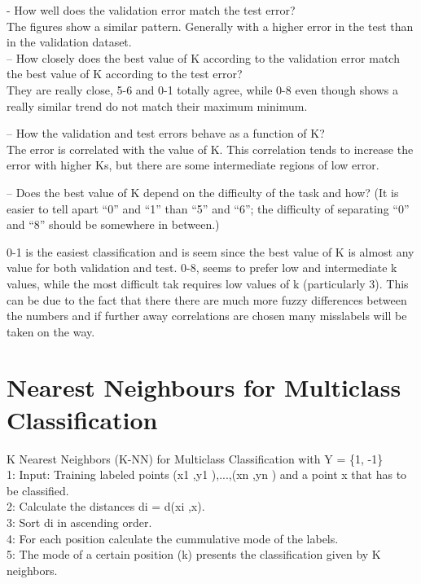 \documentclass[a4paper]{article}
\begin{document}
- How well does the validation error match the test error?\\

The figures show a similar pattern. Generally with a higher error in the test than in the validation dataset.\\

– How closely does the best value of K according to the validation error
match the best value of K according to the test error?\\
They are really close, 5-6 and 0-1 totally agree, while 0-8 even though shows a really similar trend do not match their maximum minimum.

– How the validation and test errors behave as a function of K? \\
The error is correlated with the value of K. This correlation tends to increase the error with higher Ks, but there are some intermediate regions of low error.


– Does the best value of K depend on the difficulty of the task and how?
(It is easier to tell apart “0” and “1” than “5” and “6”; the difficulty
of separating “0” and “8” should be somewhere in between.)

0-1 is the easiest classification and is seem since the best value of K is almost any value for both validation and test. 0-8, seems to prefer low and intermediate k values, while the most difficult tak requires low values of k (particularly 3). This can be due to the fact that there there are much more fuzzy differences between the numbers and if further away correlations are chosen many misslabels will be taken on the way.


\section{Nearest Neighbours for Multiclass Classification}
 K Nearest Neighbors (K-NN) for Multiclass Classification with Y = \{1, -1\} \\
1: Input: Training labeled points {(x1 ,y1 ),...,(xn ,yn )} and a point x that has to be classified. \\
2: Calculate the distances di = d(xi ,x). \\
3: Sort di in ascending order. \\
4: For each position calculate the cummulative mode of the labels. \\
5: The mode of a certain position (k) presents the classification given by K neighbors.
\end{document}
